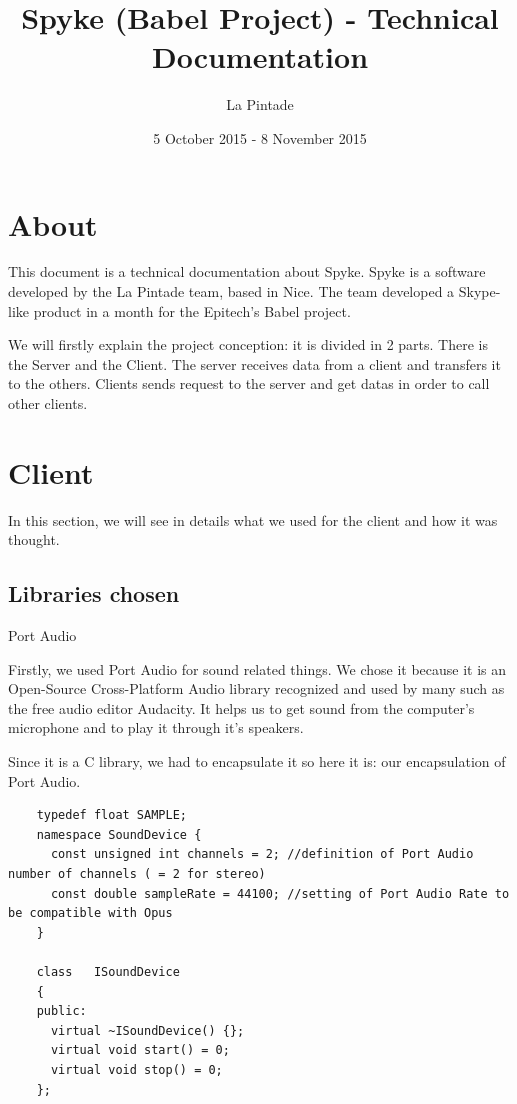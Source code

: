\documentclass{article}
\title{Spyke (Babel Project) - Technical Documentation}
\author{La Pintade}
\date{5 October 2015 - 8 November 2015}
\begin{document}
  \maketitle
  \tableofcontents


  \newpage
  \section{About}
    This document is a technical documentation about Spyke.
    Spyke is a software developed by the La Pintade team, based in Nice.
    The team developed a Skype-like product in a month for the Epitech's Babel project.
 \bigskip

  We will firstly explain the project conception: it is divided in 2 parts. There is the Server and the Client. The server receives data from a client and transfers it to the others. Clients sends request to the server and get datas in order to call other clients.
  \newpage

  \section{Client}

  In this section, we will see in details what we used for the client and how it was thought.

  \subsection{Libraries chosen}

  \bigskip
  Port Audio
  \bigskip

  Firstly, we used Port Audio for sound related things. We chose it because it is an Open-Source Cross-Platform Audio library recognized and used by many such as the free audio editor Audacity. It helps us to get sound from the computer's microphone and to play it through it's speakers.

  \bigskip
  Since it is a C library, we had to encapsulate it so here it is: our encapsulation of Port Audio.
  \bigskip

  \begin{lstlisting}
    typedef float SAMPLE;
    namespace SoundDevice {
      const unsigned int channels = 2; //definition of Port Audio number of channels ( = 2 for stereo)
      const double sampleRate = 44100; //setting of Port Audio Rate to be compatible with Opus
    }

    class   ISoundDevice
    {
    public:
      virtual ~ISoundDevice() {};
      virtual void start() = 0;
      virtual void stop() = 0;
    };
  \end{lstlisting}
\end{document}
